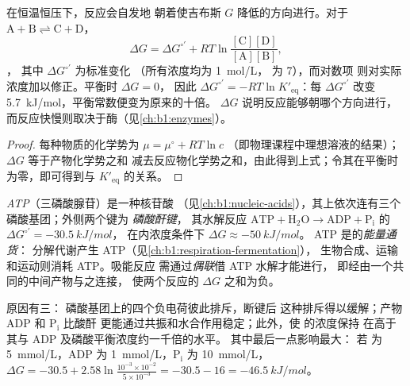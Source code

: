 \begin{proposition}[恒温恒压下反应的自由能]\label{prop:b1:water-small-molecules:gibbs}
在恒温恒压下，反应会自发地
朝着使吉布斯 $G$ 降低的方向进行。对于
$\mathrm{A} + \mathrm{B} \rightleftharpoons \mathrm{C} + \mathrm{D}$，
\[
\Delta G = \Delta G^{\circ\prime} + RT\ln\frac{[\mathrm{C}][\mathrm{D}]}{[\mathrm{A}][\mathrm{B}]},
\]，
其中 $\Delta G^{\circ\prime}$ 为标准变化
（所有浓度均为 \qty{1}{mol/L}， 为 7），而对数项
则对实际浓度加以修正。平衡时 $\Delta G = 0$，
因此 $\Delta G^{\circ\prime} = -RT\ln K'_{\text{eq}}$：每
$\Delta G^{\circ\prime}$ 改变 \qty{5.7}{kJ/mol}，平衡常数便变为原来的十倍。
$\Delta G$ 说明反应能够朝哪个方向进行，
而反应快慢则取决于酶（见\cref{ch:b1:enzymes}）。
\end{proposition}
\begin{proof}
每种物质的化学势为 $\mu = \mu^\circ + RT\ln c$
（即物理课程中理想溶液的结果）；$\Delta G$ 等于产物化学势之和
减去反应物化学势之和，由此得到上式；令其在平衡时
为零，即可得到与
$K'_{\text{eq}}$ 的关系。
\end{proof}

\begin{definition}[ATP、偶联]\label{def:b1:water-small-molecules:atp}
\emph{ATP}（三磷酸腺苷）是一种核苷酸
（见\cref{ch:b1:nucleic-acids}），其上依次连有三个磷酸基团；外侧两个键为
\emph{磷酸酐键}，
其水解反应 $\mathrm{ATP} + \mathrm{H_2O} \to \mathrm{ADP} +
\mathrm{P_i}$ 的 $\Delta G^{\circ\prime} = \qty{-30.5}{kJ/mol}$，
在内浓度条件下 $\Delta G \approx \qty{-50}{kJ/mol}$。
ATP 是的\emph{能量通货}：
分解代谢产生 ATP（见\cref{ch:b1:respiration-fermentation}），
生物合成、运输和运动则消耗 ATP。吸能反应
需通过\emph{偶联}借 ATP 水解才能进行，
即经由一个共同的中间产物与之连接，
使两个反应的 $\Delta G$ 之和为负。
\end{definition}

\begin{example}\label{ex:b1:water-small-molecules:whyatp}
原因有三： 磷酸基团上的四个负电荷彼此排斥，断键后
这种排斥得以缓解；产物 $\mathrm{ADP}$ 和 $\mathrm{P_i}$ 比酸酐
更能通过共振和水合作用稳定；此外，使  的浓度保持
在高于其与 ADP 及磷酸平衡浓度约一千倍的水平。
其中最后一点影响最大：
若  为 \qty{5}{mmol/L}，ADP 为 \qty{1}{mmol/L}，$\mathrm{P_i}$
为 \qty{10}{mmol/L}，
$\Delta G = -30.5 + 2.58\ln\frac{10^{-3}\times 10^{-2}}{5\times 10^{-3}}
= -30.5 - 16 = \qty{-46.5}{kJ/mol}$。
\end{example}

